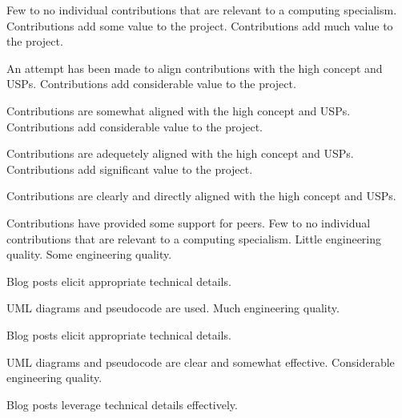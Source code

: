 \documentclass{../../fal_assignment}
\begin{document}
\begin{markingrubric}
%
        \grade\fail Few to no individual contributions that are relevant to a computing specialism.
        \grade Contributions add some value to the project.
        \grade Contributions add much value to the project.
            \par An attempt has been made to align contributions with the high concept and USPs.
        \grade Contributions add considerable value to the project.
            \par Contributions are somewhat aligned with the high concept and USPs.
        \grade Contributions add considerable value to the project.
            \par Contributions are adequetely aligned with the high concept and USPs.
        \grade Contributions add significant value to the project.
            \par Contributions are clearly and directly aligned with the high concept and USPs.
            \par Contributions have provided some support for peers.
%
        \grade\fail Few to no individual contributions that are relevant to a computing specialism.
        \grade Little engineering quality.
        \grade Some engineering quality.
            \par Blog posts elicit appropriate technical details.
            \par UML diagrams and pseudocode are used.
        \grade Much engineering quality.
            \par Blog posts elicit appropriate technical details.
            \par UML diagrams and pseudocode are clear and somewhat effective.
        \grade Considerable engineering quality.
            \par Blog posts leverage technical details effectively.

\end{markingrubric}
\end{document}
